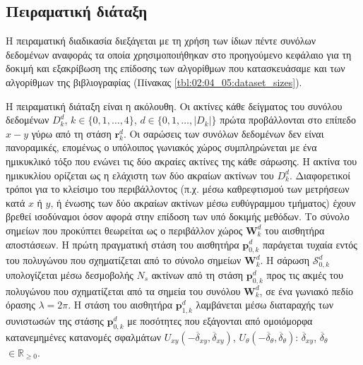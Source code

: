 \subsection{Πειραματική διάταξη}
\label{subsection:02_05_03:01}

Η πειραματική διαδικασία διεξάγεται με τη χρήση των ίδιων πέντε συνόλων
δεδομένων αναφοράς τα οποία χρησιμοποιήθηκαν στο προηγούμενο κεφάλαιο για τη
δοκιμή και εξακρίβωση της επίδοσης των αλγορίθμων που κατασκευάσαμε και των
αλγορίθμων της βιβλιογραφίας (Πίνακας \ref{tbl:02:04_05:dataset_sizes}).

Η πειραματική διάταξη είναι η ακόλουθη. Οι ακτίνες κάθε δείγματος του συνόλου
δεδομένων $D_k^d$, $k \in \{0,1,\dots,4\}$, $d \in \{0,1,\dots,|D_k|\}$ πρώτα
προβάλλονται στο επίπεδο $x-y$ γύρω από τη στάση $\bm{r}_k^d$. Οι σαρώσεις των
συνόλων δεδομένων δεν είναι πανοραμικές, επομένως ο υπόλοιπος γωνιακός χώρος
συμπληρώνεται με ένα ημικυκλικό τόξο που ενώνει τις δύο ακραίες ακτίνες της
κάθε σάρωσης. Η ακτίνα του ημικυκλίου ορίζεται ως η ελάχιστη των δύο ακραίων
ακτίνων του $D_k^d$. Διαφορετικοί τρόποι για το κλείσιμο του περιβάλλοντος
(π.χ.  μέσω καθρεφτισμού των μετρήσεων κατά $x$ ή $y$, ή ένωσης των δύο ακραίων
ακτίνων μέσω ευθύγραμμου τμήματος) έχουν βρεθεί ισοδύναμοι όσον αφορά στην
επίδοση των υπό δοκιμής μεθόδων. Το σύνολο σημείων που προκύπτει θεωρείται ως ο
περιβάλλον χώρος $\bm{W}_k^d$ του αισθητήρα αποστάσεων. Η πρώτη πραγματική
στάση του αισθητήρα $\bm{p}_{0,k}^d$ παράγεται τυχαία εντός του πολυγώνου που
σχηματίζεται από το σύνολο σημείων $\bm{W}_k^d$. Η σάρωση $\mathcal{S}_{0,k}^d$
υπολογίζεται μέσω δεσμοβολής $N_s$ ακτίνων από τη στάση $\bm{p}_{0,k}^d$ προς
τις ακμές του πολυγώνου που σχηματίζεται από τα σημεία του συνόλου
$\bm{W}_k^d$, σε ένα γωνιακό πεδίο όρασης $\lambda = 2\pi$. Η στάση του
αισθητήρα $\bm{p}_{1,k}^d$ λαμβάνεται μέσω διαταραχής των συνιστωσών της στάσης
$\bm{p}^d_{0,k}$ με ποσότητες που εξάγονται από ομοιόμορφα κατανεμημένες
κατανομές σφαλμάτων $U_{xy}(-\overline{\delta}_{xy}, \overline{\delta}_{xy})$,
$U_{\theta}(-\overline{\delta}_{\theta}, \overline{\delta}_{\theta})$:
$\overline{\delta}_{xy}$, $\overline{\delta}_\theta$ $\in \mathbb{R}_{\geq 0}$.

